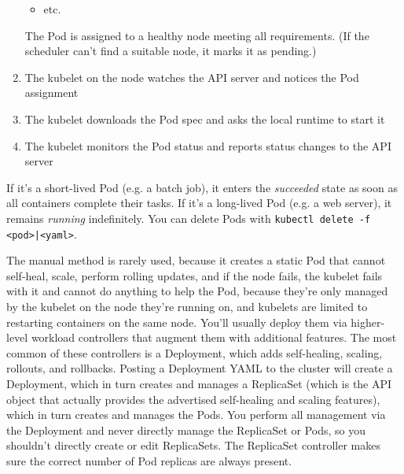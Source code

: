 \documentclass[8pt, table, xcdraw]{article}%
\begin{document}
\begin{enumerate}
\begin{itemize}
		\item etc.
    \end{itemize}
    The Pod is assigned to a healthy node meeting all requirements. (If the scheduler can’t find a suitable node, it marks it as pending.)
    \item The kubelet on the node watches the API server and notices the Pod assignment
    \item The kubelet downloads the Pod spec and asks the local runtime to start it
    \item The kubelet monitors the Pod status and reports status changes to the API server
\end{enumerate}

If it’s a short-lived Pod (e.g. a batch job), it enters the \emph{succeeded} state as soon as all containers complete their tasks. If it’s a long-lived Pod (e.g. a web server), it remains \emph{running} indefinitely. You can delete Pods with \lstinline{kubectl delete -f <pod>|<yaml>}.

The manual method is rarely used, because it creates a static Pod that cannot self-heal, scale, perform rolling updates, and if the node fails, the kubelet fails with it and cannot do anything to help the Pod, because they’re only managed by the kubelet on the node they’re running on, and kubelets are limited to restarting containers on the same node. You’ll usually deploy them via higher-level workload controllers that augment them with additional features. The most common of these controllers is a Deployment, which adds self-healing, scaling, rollouts, and rollbacks. Posting a Deployment YAML to the cluster will create a Deployment, which in turn creates and manages a ReplicaSet (which is the API object that actually provides the advertised self-healing and scaling features), which in turn creates and manages the Pods. You perform all management via the Deployment and never directly manage the ReplicaSet or Pods, so you shouldn’t directly create or edit ReplicaSets. The ReplicaSet controller makes sure the correct number of Pod replicas are always present.
\end{document}
